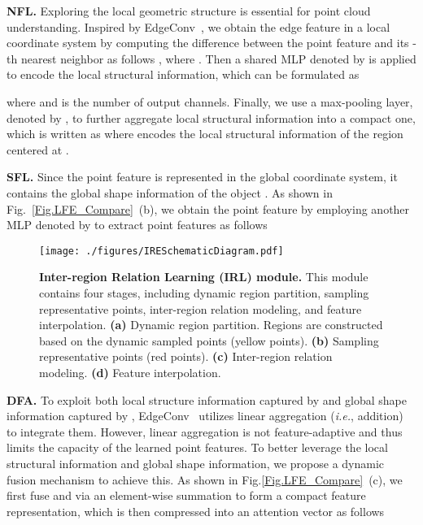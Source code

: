 \documentclass[journal]{IEEEtran}
\def\ie{\emph{i.e.}}
\begin{document}
\noindent\textbf{NFL.} Exploring the local geometric structure is essential for point cloud understanding. 
Inspired by EdgeConv~\cite{wang2019dynamic}, we obtain the edge feature  in a local coordinate system by computing the difference between the point feature  and its -th nearest neighbor  as follows , where . Then a shared MLP denoted by  is applied to encode the local structural information, which can be formulated as 


where  and  is the number of output channels. Finally, we use a max-pooling layer, denoted by , to further aggregate local structural information into a compact one, which is written as 
 where  encodes the local structural information of the region centered at . 

\noindent\textbf{SFL.} Since the point feature  is represented in the global coordinate system, it contains the global shape information of the object \cite{wang2019dynamic}. As shown in Fig.~\ref{Fig.LFE_Compare}~(b), we obtain the point feature  by employing another MLP denoted by  to extract point features as follows


\begin{figure*}
\centering
\texttt{[image: ./figures/IRESchematicDiagram.pdf]}
\caption{\textbf{Inter-region Relation Learning (IRL) module.} This module contains four stages, including dynamic region partition, sampling representative points, inter-region relation modeling, and feature interpolation. \textbf{(a)} Dynamic region partition. Regions are constructed based on the dynamic sampled points (yellow points). \textbf{(b)} Sampling representative points (red points).  \textbf{(c)} Inter-region relation modeling. \textbf{(d)} Feature interpolation.}

\label{Fig.IRESchematicDiagram}
\vspace{-2ex}
\end{figure*}


\noindent\textbf{DFA.} To exploit both local structure information captured by  and global shape information captured by , EdgeConv~\cite{wang2019dynamic} utilizes linear aggregation (\ie, addition) to integrate them. However, linear aggregation is not feature-adaptive and thus limits the capacity of the learned point features. To better leverage the local structural information and global shape information, we propose a dynamic fusion mechanism to achieve this.
As shown in Fig.\ref{Fig.LFE_Compare}~(c), we first fuse  and  via an element-wise summation to form a compact feature representation, which is then compressed into an attention vector  as follows
\end{document}
